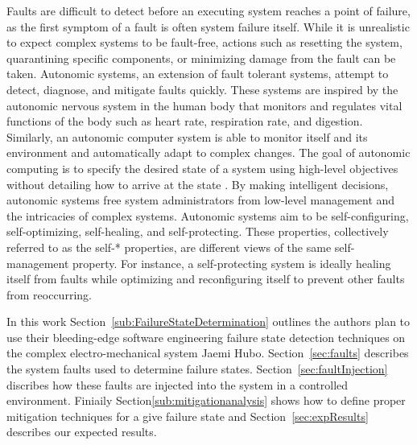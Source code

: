 Faults are difficult to detect before an executing system reaches a point of failure, as the first symptom of a fault is often system failure itself. While it is unrealistic to expect complex systems to be fault-free, actions such as resetting the system, quarantining specific components, or minimizing damage from the fault can be taken. Autonomic systems, an extension of fault tolerant systems, attempt to detect, diagnose, and mitigate faults quickly. These systems are inspired by the autonomic nervous system in the human body that monitors and regulates vital  functions of the body such as heart rate, respiration rate, and digestion. Similarly, an autonomic computer system is able to monitor itself and its environment and automatically adapt to complex changes. The goal of autonomic computing is to specify the desired state of a system using high-level objectives without detailing how to arrive at the state \cite{1160055,4061119,1301340}. By making intelligent decisions, autonomic systems free system administrators from low-level management and the intricacies of complex systems. Autonomic systems aim to be self-configuring, self-optimizing, self-healing, and self-protecting. These properties, collectively referred to as the self-* properties, are different views of the same self-man\-age\-ment property. For instance, a self-protecting system is ideally healing itself from faults while optimizing and reconfiguring itself to prevent other faults from reoccurring.


In this work Section~\ref{sub:FailureStateDetermination} outlines the authors plan to use their bleeding-edge software 
engineering failure state detection techniques on the complex electro-mechanical system Jaemi Hubo.  Section~\ref{sec:faults} describes the
system faults used to determine failure states.  Section~\ref{sec:faultInjection} discribes how these faults are injected
into the system in a controlled environment. 
Finiaily Section\ref{sub:mitigationanalysis} shows how to define proper mitigation techniques for a give failure state and 
Section~\ref{sec:expResults} describes our expected results.

